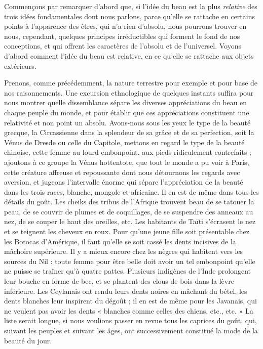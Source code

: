 \documentclass[a4paper, 11pt, oneside, landscape]{article}
\begin{document}
Commençons par remarquer d'abord que, si l'idée du beau est la plus \emph{relative} des trois idées fondamentales dont nous parlons, parce qu'elle se rattache en certains points à l'apparence des êtres, qui n'a rien d'absolu, nous pourrons trouver en nous, cependant, quelques principes irréductibles qui forment le fond de nos conceptions, et qui offrent les caractères de l'absolu et de l'universel. Voyons d'abord comment l'idée du beau est relative, en ce qu'elle se rattache aux objets extérieurs.

Prenons, comme précédemment, la nature terrestre pour exemple et pour base de nos raisonnements. Une excursion ethnologique de quelques instants suffira pour nous montrer quelle dissemblance sépare les diverses appréciations du beau en chaque peuple du monde, et pour établir que ces appréciations constituent une relativité et non point un absolu. Avons-nous sous les yeux le type de la beauté grecque, la Circassienne dans la splendeur de sa grâce et de sa perfection, soit la Vénus de Dresde ou celle du Capitole, mettons en regard le type de la beauté chinoise, cette femme au lourd embonpoint, aux pieds ridiculement contrefaits ; ajoutons à ce groupe la Vénus hottentote, que tout le monde a pu voir à Paris, cette créature affreuse et repoussante dont nous détournons les regards avec aversion, et jugeons l'intervalle énorme qui sépare l'appréciation de la beauté dans les trois races, blanche, mongole et africaine. Il en est de même dans tous les détails du goût. Les cheiks des tribus de l'Afrique trouvent beau de se tatouer la peau, de se couvrir de plumes et de coquillages, de se suspendre des anneaux au nez, de se couper le haut des oreilles, etc. Les habitants de Taïti s'écrasent le nez et se teignent les cheveux en roux. Pour qu'une jeune fille soit présentable chez les Botocas d'Amérique, il faut qu'elle se soit cassé les dents incisives de la mâchoire supérieure. Il y a mieux encore chez les nègres qui habitent vers les sources du Nil : toute femme pour être belle doit avoir un tel embonpoint qu'elle ne puisse se traîner qu'à quatre pattes. Plusieurs indigènes de l'Inde prolongent leur bouche en forme de bec, et se plantent des clous de bois dans la lèvre inférieure. Les Ceylanais ont rendu leurs dents noires en mâchant du bétel, les dents blanches leur inspirent du dégoût ; il en est de même pour les Javanais, qui ne veulent pas avoir les dents « blanches comme celles des chiens, etc., etc. » La liste serait longue, si nous voulions passer en revue tous les caprices du goût, qui, suivant les peuples et suivant les âges, ont successivement constitué la mode de la beauté du jour.
\end{document}
